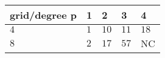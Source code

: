 \begin{tabular}{lllll}
\hline
 grid/degree p   & 1   & 2    & 3    & 4    \\
\hline
 $4$             & $1$ & $10$ & $11$ & $18$ \\
 $8$             & $2$ & $17$ & $57$ & NC   \\
\hline
\end{tabular}